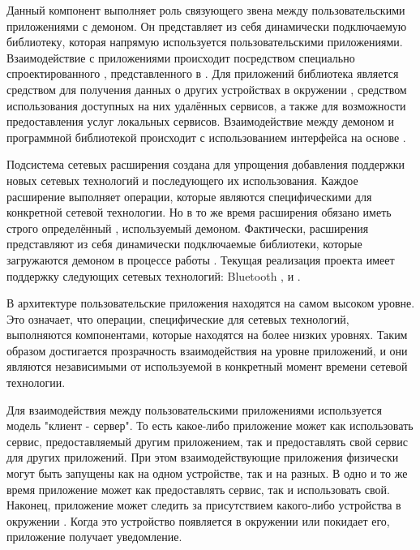 \Sentence
Данный компонент выполняет роль связующего звена между пользовательскими приложениями с демоном.
\Sentence
Он представляет из себя динамически подключаемую библиотеку, которая напрямую используется 
пользовательскими приложениями.
\Sentence
Взаимодействие с приложениями происходит посредством специально спроектированного 
, представленного в .
\Sentence
Для приложений библиотека является средством для получения данных о других устройствах в окружении 
\PeerHood, средством использования доступных на них удалённых сервисов, а также для возможности 
предоставления услуг локальных сервисов.
\Sentence
Взаимодействие между демоном и программной библиотекой происходит с использованием интерфейса на 
основе  .

\Sentence
Подсистема сетевых расширения создана для упрощения добавления поддержки новых сетевых технологий и 
последующего их использования.
\Sentence
Каждое расширение выполняет операции, которые являются специфическими для конкретной сетевой 
технологии.
\Sentence
Но в то же время расширения обязано иметь строго определённый , используемый 
демоном.
\Sentence
Фактически, расширения представляют из себя динамически подключаемые библиотеки, которые загружаются 
демоном в процессе работы \PeerHood.
\Sentence
Текущая реализация проекта имеет поддержку следующих сетевых технологий: Bluetooth 
,   и  .

\Sentence
В архитектуре \PeerHood пользовательские приложения находятся на самом высоком уровне.
\Sentence
Это означает, что операции, специфические для сетевых технологий, выполняются 
компонентами, которые находятся на более низких уровнях.
\Sentence
Таким образом достигается прозрачность взаимодействия на уровне приложений, и они являются 
независимыми от используемой в конкретный момент времени сетевой технологии.

\Sentence
Для взаимодействия между пользовательскими приложениями используется модель "клиент - сервер".
\Sentence
То есть какое-либо приложение может как использовать сервис, предоставляемый другим приложением, 
так и предоставлять свой сервис для других приложений. 
\Sentence
При этом взаимодействующие приложения физически могут быть запущены как на одном устройстве, так и 
на разных. 
\Sentence
В одно и то же время приложение может как предоставлять сервис, так и использовать свой.
\Sentence
Наконец, приложение может следить за присутствием какого-либо устройства в окружении \PeerHood.
\Sentence
Когда это устройство появляется в окружении или покидает его, приложение получает уведомление.
